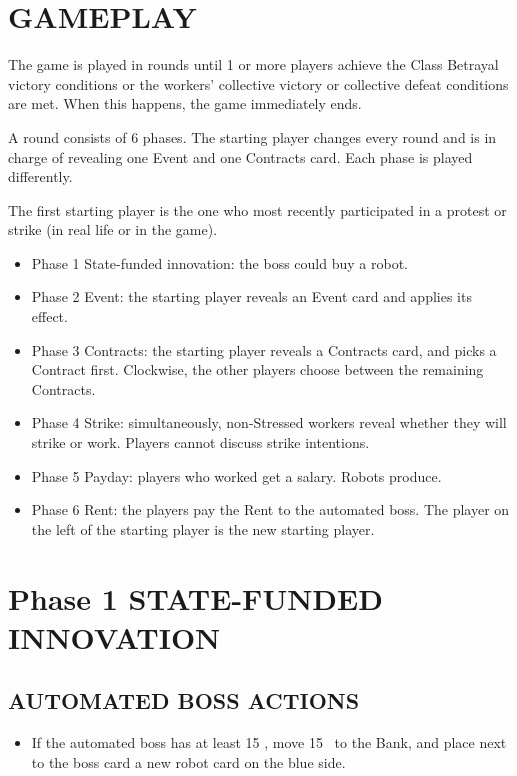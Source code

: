 \section{GAMEPLAY}

    The game is played in rounds until 1 or more players achieve the Class Betrayal
    victory conditions or the workers' collective victory or collective defeat conditions
    are met. When this happens, the game immediately ends.
    
    A round consists of 6 phases. The starting player changes every round and is in
    charge of revealing one Event and one Contracts card. Each phase is played differently.
    
    The first starting player is the one who most recently participated in a protest
    or strike (in real life or in the game).

    \begin{itemize}
        \item Phase 1 State-funded innovation: the boss could buy a robot.
        \item Phase 2 Event: the starting player reveals an Event card and applies its effect.
        \item Phase 3 Contracts: the starting player reveals a Contracts card, and picks
        a Contract first. Clockwise, the other players choose between the remaining
        Contracts.
        \item Phase 4 Strike: simultaneously, non-Stressed workers reveal whether they
        will strike or work. Players cannot discuss strike intentions.
        \item Phase 5 Payday: players who worked get a salary. Robots produce.
        \item Phase 6 Rent: the players pay the Rent to the automated boss. The player
        on the left of the starting player is the new starting player.
    \end{itemize}



\section{Phase 1 STATE-FUNDED INNOVATION}

    \subsection{AUTOMATED BOSS ACTIONS}
    
        \begin{itemize}
            \item If the automated boss has at least 15 \faRubleSign, move 15 \faRubleSign\ to the Bank, and place
            next to the boss card a new robot card on the blue side.
        \end{itemize}



